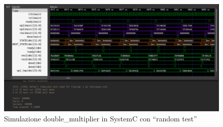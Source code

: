\documentclass[]{IEEEtran}
\begin{document}
\begin{figure}[bt]
    \centering
    \includegraphics[width=\textwidth]{figures/sim_systemc_rnd}
    \caption{Simulazione double\_multiplier in SystemC con ``random test''}
    \label{fig:SIM_SC_RND}
\end{figure}
\end{document}

